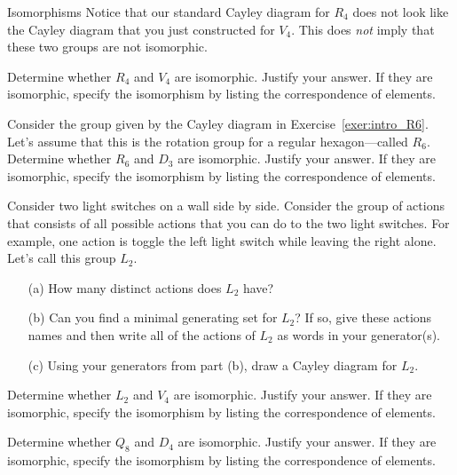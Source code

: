 \begin{section}{Isomorphisms}
Notice that our standard Cayley diagram for \(R_4\) does not look like the Cayley diagram that you just constructed for \(V_4\).  This does \emph{not} imply that these two groups are not isomorphic.

\begin{problem}
Determine whether \(R_4\) and \(V_4\) are isomorphic.  Justify your answer.  If they are isomorphic, specify the isomorphism by listing the correspondence of elements.
\end{problem}

\begin{problem}\label{prob:R6_not_iso_D3}
Consider the group given by the Cayley diagram in Exercise~\ref{exer:intro_R6}.  Let's assume that this is the rotation group for a regular hexagon---called \(R_6\).  Determine whether \(R_6\) and \(D_3\) are isomorphic.  Justify your answer.  If they are isomorphic, specify the isomorphism by listing the correspondence of elements.
\end{problem}

\begin{exercise}
Consider two light switches on a wall side by side.  Consider the group of actions that consists of all possible actions that you can do to the two light switches.  For example, one action is toggle the left light switch while leaving the right alone.  Let's call this group \(L_2\).
\begin{enumerate}
\item[(a)] How many distinct actions does \(L_2\) have?
\item[(b)] Can you find a minimal generating set for \(L_2\)?  If so, give these actions names and then write all of the actions of \(L_2\) as words in your generator(s).
\item[(c)] Using your generators from part (b), draw a Cayley diagram for \(L_2\).
\end{enumerate}
\end{exercise}

\begin{problem}
Determine whether \(L_2\) and \(V_4\) are isomorphic.  Justify your answer.  If they are isomorphic, specify the isomorphism by listing the correspondence of elements.
\end{problem}

\begin{problem}
Determine whether \(Q_8\) and \(D_4\) are isomorphic.  Justify your answer.  If they are isomorphic, specify the isomorphism by listing the correspondence of elements.
\end{problem}


\end{section}
